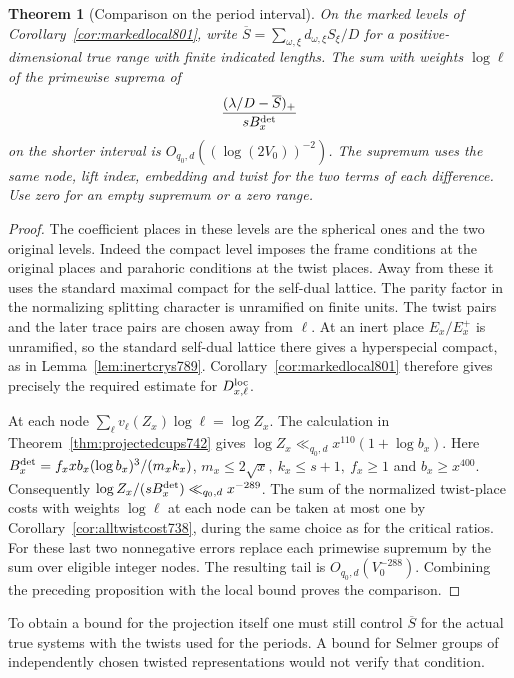 \documentclass[a4paper,11pt]{article}
\newtheorem{theorem}[proposition]{Theorem}
\theoremstyle{definition}
\theoremstyle{remark}
\numberwithin{equation}{section}
\begin{document}
\begin{theorem}[Comparison on the period interval]
\leavevmode\label{thm:markedperiod802}
On the marked levels of Corollary~\ref{cor:markedlocal801},
write \(\overline S=\sum_{\omega,\xi}d_{\omega,\xi}S_\xi/D\)
for a positive-dimensional true range with finite indicated
lengths. The sum with weights \(\log\ell\) of the primewise
suprema of
\[
             \frac{(\lambda/D-\overline S)_+}{sB_x^{\rm det}}
\]
on the shorter interval is
\(O_{q_0,d}((\log(2V_0))^{-2})\). The supremum uses the same
node, lift index, embedding and twist for the two terms of
each difference. Use zero for an empty supremum or a zero range.
\end{theorem}
\begin{proof}
The coefficient places in these levels are the spherical ones
and the two original levels. Indeed the compact level imposes
the frame conditions at the original places and parahoric
conditions at the twist places. Away from these it uses the
standard maximal compact for the self-dual lattice. The parity
factor in the normalizing splitting character is unramified
on finite units. The twist pairs and the later trace pairs
are chosen away from \(\ell\). At an inert place
\(E_x/E_x^+\) is unramified, so the standard self-dual lattice
there gives a hyperspecial compact, as in
Lemma~\ref{lem:inertcrys789}. Corollary~\ref{cor:markedlocal801}
therefore gives precisely the required estimate for
\(D_{x,\ell}^{\rm loc}\).

At each node \(\sum_\ell v_\ell(Z_x)\log\ell=\log Z_x\).
The calculation in Theorem~\ref{thm:projectedcups742} gives
\(\log Z_x\ll_{q_0,d}x^{110}(1+\log b_x)\). Here
\(B_x^{\rm det}=f_xxb_x(\log b_x)^3/(m_xk_x)\),
\(m_x\le2\sqrt x,\ k_x\le s+1,\ f_x\ge1\) and \(b_x\ge x^{400}\).
Consequently \(\log Z_x/(sB_x^{\rm det})\ll_{q_0,d}x^{-289}\).
The sum of the normalized twist-place costs with weights
\(\log\ell\) at each node can be taken at most one by
Corollary~\ref{cor:alltwistcost738}, during the same choice as
for the critical ratios. For these last two nonnegative errors
replace each primewise supremum by the sum over eligible integer
nodes. The resulting tail is \(O_{q_0,d}(V_0^{-288})\).
Combining the preceding proposition with the local bound proves
the comparison.
\end{proof}
To obtain a bound for the projection itself one must still control
\(\overline S\) for the actual true systems with the twists used
for the periods. A bound for Selmer groups of independently
chosen twisted representations would not verify that condition.
\clearpage
\end{document}

